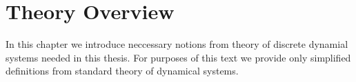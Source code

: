 \chapter{Theory Overview}
In this chapter we introduce neccessary notions from theory of discrete dynamial systems needed in this thesis.
For purposes of this text we provide only simplified definitions from standard theory of dynamical systems.





\endinput